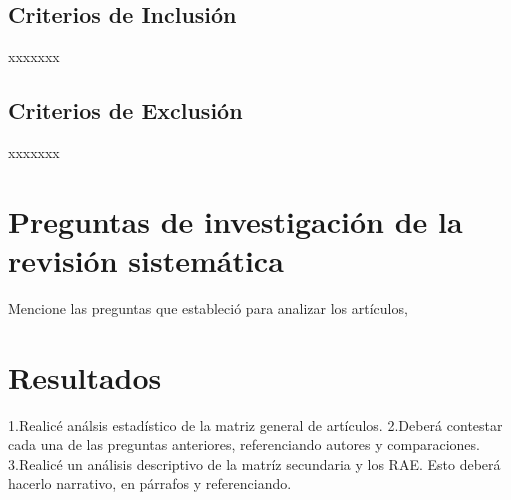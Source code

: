 \subsection{Criterios de Inclusión}
xxxxxxx
\subsection{Criterios de Exclusión}
xxxxxxx

\section{Preguntas de investigación de la revisión sistemática}
Mencione las preguntas que estableció para analizar los artículos,

\section{Resultados}
1.Realicé análsis estadístico de la matriz general de artículos.
2.Deberá contestar cada una de las preguntas anteriores, referenciando autores y comparaciones.
3.Realicé un análisis descriptivo de la matríz secundaria y los RAE. Esto deberá hacerlo narrativo, en párrafos y referenciando.